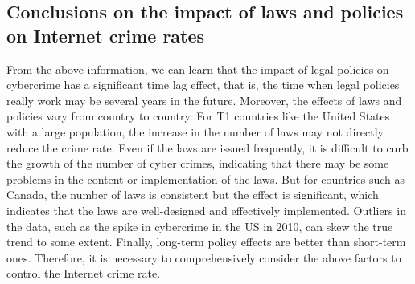 \subsection{Conclusions on the impact of laws and policies on Internet crime rates}
\label{subsec:conclusions-on-the-impact-of-laws-and-policies-on-internet-crime-rates} %
    From the above information, we can learn that the impact of legal policies on cybercrime has a significant time lag effect,
    that is, the time when legal policies really work may be several years in the future.
    Moreover, the effects of laws and policies vary from country to country.
    For T1 countries like the United States with a large population,
    the increase in the number of laws may not directly reduce the crime rate.
    Even if the laws are issued frequently, it is difficult to curb the growth of the number of cyber crimes,
    indicating that there may be some problems in the content or implementation of the laws.
    But for countries such as Canada, the number of laws is consistent but the effect is significant,
    which indicates that the laws are well-designed and effectively implemented.
    Outliers in the data, such as the spike in cybercrime in the US in 2010, can skew the true trend to some extent.
    Finally, long-term policy effects are better than short-term ones.
    Therefore, it is necessary to comprehensively consider the above factors to control the Internet crime rate.
